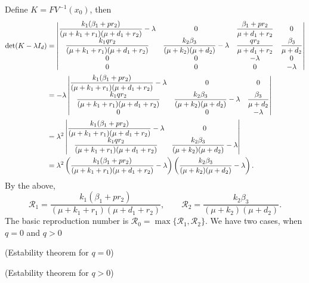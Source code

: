 Define $K = FV^{-1}(x_0)$, then
\begin{align*}	
	\det(K-\lambda I_d)
	&= 
	\begin{vmatrix}
		\dfrac{k_1(\beta_1 + pr_2)}{(\mu + k_1 + r_1)(\mu + d_1 +r_2)} 
	    -\lambda 
	    & 0 
	    & \dfrac{\beta_1 + pr_2}{\mu + d_1 +r_2} 
	    & 0 
	  \\
		\dfrac{k_1 qr_2}{(\mu + k_1 + r_1)(\mu + d_1 +r_2)} 
		& \dfrac{k_2 \beta_3}{(\mu + k_2)(\mu + d_2)} -\lambda 
		& \dfrac{qr_2}{\mu + d_1 +r_2} 
		& \dfrac{\beta_3}{\mu + d_2} 
		\\
		0 & 0 & -\lambda & 0 
		\\
		0 & 0 & 0 & -\lambda 
		\\
	\end{vmatrix} \notag \\
	&= -\lambda
	\begin{vmatrix}
		\dfrac{k_1(\beta_1 + pr_2)}{(\mu + k_1 + r_1)(\mu + d_1 +r_2)} 
			-\lambda & 0 & 0 
		\\
		\dfrac{k_1 q r_2}{(\mu + k_1 + r_1)(\mu + d_1 +r_2)} 
			& \dfrac{k_2 \beta_3}{(\mu + k_2)(\mu + d_2)}
        -\lambda &\dfrac{\beta_3}{\mu + d_2} 
    \\
		0 & 0 & -\lambda 
	\end{vmatrix}
	\\
	&= \lambda^2
	\begin{vmatrix}
		\dfrac{k_1(\beta_1 + pr_2)}{(\mu + k_1 + r_1)(\mu + d_1 +r_2)} -\lambda 
			& 0 
		\\
		\dfrac{k_1 q r_2}{(\mu + k_1 + r_1)(\mu + d_1 +r_2)} 
			& \dfrac{k_2 \beta_3}{(\mu + k_2)(\mu + d_2)} 
       -\lambda 
    \\
	\end{vmatrix} 
	\\
		&= 
		\lambda^2 
	  \left( 
		  \dfrac{k_1(\beta_1 + pr_2)}{(\mu + k_1 + r_1)(\mu + d_1 +r_2)} 
		  -\lambda 
		\right) 
    \left(
	    \dfrac{k_2 \beta_3}{(\mu + k_2)(\mu + d_2)}-\lambda 
	  \right).
\end{align*} 
By the above,
$$
	\mathscr{R}_{1} = 
		\dfrac{k_1(\beta_{1} + pr_2)}{(\mu + k_1 + r_1)(\mu + d_1 +r_2)} ,
		\qquad
	\mathscr{R}_{2} = 
		\dfrac{k_2 	\beta_{3}}{(\mu + k_2)(\mu + d_2)}.
$$
The basic reproduction number is 
$
	\mathscr{R}_{0} =  \max\lbrace \mathscr{R}_{1},\mathscr{R}_{2} 
\rbrace
$.
 \newpage
 We have two cases, when $q=0$ and $q>0$
 \begin{theorem}
    (Estability theorem for $q=0$)
 \end{theorem}
  \begin{theorem}
    (Estability theorem for $q>0$)
 \end{theorem}